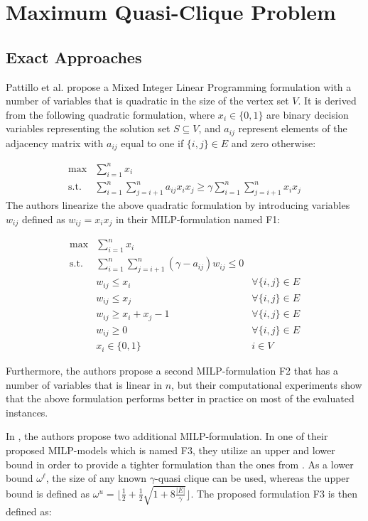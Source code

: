 \documentclass[draft,final]{vutinfth} %
\begin{document}
\section{Maximum Quasi-Clique Problem}\label{sec:mqcp-related-work}

\subsection{Exact Approaches}\label{milp-mqcp}
Pattillo et al. \cite{pattillo_maximum_2013} propose a Mixed Integer Linear Programming formulation with a number of variables that is quadratic in the size of the vertex set $V$. 
It is derived from the following quadratic formulation, where $x_i \in \{0,1\}$ are binary decision variables representing the solution set $S \subseteq V$, and $a_{ij}$ represent elements of the adjacency matrix with $a_{ij}$ equal to one if $\{i,j\} \in E$ and zero otherwise: 

\begin{align}
    \max & \sum_{i=1}^{n} x_i  \\
    \text{s.t. } & \sum_{i=1}^n \sum_{j=i+1}^n a_{ij} x_i x_j \geq \gamma \sum_{i=1}^n \sum_{j=i+1}^n x_i x_j 
\end{align}
The authors linearize the above quadratic formulation by introducing variables $w_{ij}$ defined as $w_{ij} = x_i x_j$ in their MILP-formulation named F1: 

\begin{align}
    \max & \sum_{i=1}^n x_i &\\
    \text{s.t. } & \sum_{i=1}^n \sum_{j=i+1}^n (\gamma - a_{ij}) w_{ij} \leq 0  &\\
     & w_{ij} \leq x_i & \forall \{i,j\} \in E\\
     & w_{ij} \leq x_j & \forall \{i, j\} \in E\\
     & w_{ij} \geq x_i + x_j - 1 & \forall \{i, j\} \in E\\
    & w_{ij} \geq 0 & \forall \{i, j\} \in E \\
    & x_i \in \{0,1\} & i \in V
\end{align}

Furthermore, the authors propose a second MILP-formulation F2 that has a number of variables that is linear in $n$, but their computational experiments show that the above formulation performs better in practice on most of the evaluated instances. 

In \cite{VeremyevPBP16}, the authors propose two additional MILP-formulation. 
In one of their proposed MILP-models which is named F3, they utilize an upper and lower bound in order to provide a tighter formulation than the ones from \cite{pattillo_maximum_2013}. As a lower bound $\omega^{\ell}$, the size of any known $\gamma$-quasi clique can be used, whereas the upper bound is defined as  $\omega^u = \lfloor \frac{1}{2} + \frac{1}{2} \sqrt{1 + 8\frac{|E|}{\gamma}} \rfloor$. The proposed formulation F3 is then defined as: 
\end{document}
